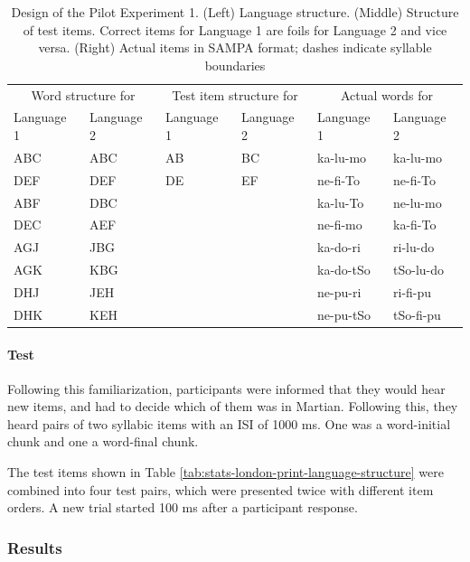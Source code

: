\documentclass[]{article}
\let\oldparagraph\paragraph
\renewcommand{\paragraph}[1]{\oldparagraph{#1}\mbox{}}
\begin{document}
\begin{table}

\caption{\label{tab:bcn-print-language-structure}Design of the Pilot Experiment 1. (Left) Language structure. (Middle) Structure of test items. Correct items for Language 1 are foils for Language 2 and vice versa. (Right) Actual items in SAMPA format; dashes indicate syllable boundaries}
\centering
\begin{tabular}[t]{llllll}
\toprule
\multicolumn{2}{c}{Word structure for} & \multicolumn{2}{c}{Test item structure for} & \multicolumn{2}{c}{Actual words for} \\
Language 1 & Language 2 & Language 1 & Language 2 & Language 1 & Language 2\\
\midrule
ABC & ABC & AB & BC & ka-lu-mo & ka-lu-mo\\
DEF & DEF & DE & EF & ne-fi-To & ne-fi-To\\
ABF & DBC &  &  & ka-lu-To & ne-lu-mo\\
DEC & AEF &  &  & ne-fi-mo & ka-fi-To\\
AGJ & JBG &  &  & ka-do-ri & ri-lu-do\\
\addlinespace
AGK & KBG &  &  & ka-do-tSo & tSo-lu-do\\
DHJ & JEH &  &  & ne-pu-ri & ri-fi-pu\\
DHK & KEH &  &  & ne-pu-tSo & tSo-fi-pu\\
\bottomrule
\end{tabular}
\end{table}

\paragraph{Test}\label{test}

Following this familiarization, participants were informed that they
would hear new items, and had to decide which of them was in Martian.
Following this, they heard pairs of two syllabic items with an ISI of
1000 ms. One was a word-initial chunk and one a word-final chunk.

The test items shown in Table
\ref{tab:stats-london-print-language-structure} were combined into four
test pairs, which were presented twice with different item orders. A new
trial started 100 ms after a participant response.

\subsubsection{Results}\label{results-1}
\end{document}
